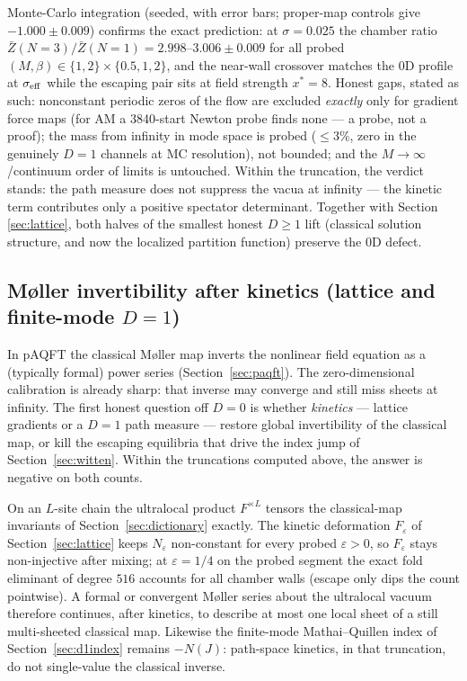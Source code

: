 \documentclass[11pt]{article}
\theoremstyle{definition}
\theoremstyle{remark}
\begin{document}
Monte-Carlo integration (seeded, with error bars; proper-map controls
give $-1.000\pm0.009$) confirms the exact prediction: at
$\sigma=0.025$ the chamber ratio
$\bar Z(N{=}3)/\bar Z(N{=}1)=2.998$--$3.006\pm0.009$ for all probed
$(M,\beta)\in\{1,2\}\times\{0.5,1,2\}$, and the near-wall crossover
matches the 0D profile at $\sigma_{\rm eff}$ while the escaping pair
sits at field strength $x^*=8$. Honest gaps, stated as such:
nonconstant periodic zeros of the flow are excluded \emph{exactly}
only for gradient force maps (for AM a 3840-start Newton probe finds
none — a probe, not a proof); the mass from infinity in mode space is
probed ($\le3\%$, zero in the genuinely $D=1$ channels at MC
resolution), not bounded; and the $M\to\infty$/continuum order of
limits is untouched. Within the truncation, the verdict stands: the
path measure does not suppress the vacua at infinity — the kinetic
term contributes only a positive spectator determinant. Together with
Section \ref{sec:lattice}, both halves of the smallest honest
$D\ge 1$ lift (classical solution structure, and now the localized
partition function) preserve the 0D defect.

\subsection{M{\o}ller invertibility after kinetics
(lattice and finite-mode $D=1$)}\label{sec:moller-kinetics}

In pAQFT the classical M{\o}ller map inverts the nonlinear field
equation as a (typically formal) power series
(Section~\ref{sec:paqft}). The zero-dimensional calibration is already
sharp: that inverse may converge and still miss sheets at infinity.
The first honest question off $D=0$ is whether \emph{kinetics} ---
lattice gradients or a $D=1$ path measure --- restore global
invertibility of the classical map, or kill the escaping equilibria
that drive the index jump of Section~\ref{sec:witten}. Within the
truncations computed above, the answer is negative on both counts.

On an $L$-site chain the ultralocal product $F^{\times L}$ tensors the
classical-map invariants of Section~\ref{sec:dictionary} exactly.
The kinetic deformation $F_\varepsilon$ of Section~\ref{sec:lattice}
keeps $N_\varepsilon$ non-constant for every probed $\varepsilon>0$, so
$F_\varepsilon$ stays non-injective after mixing; at $\varepsilon=1/4$
on the probed segment the exact fold eliminant of degree $516$
accounts for all chamber walls (escape only dips the count
pointwise). A formal or convergent M{\o}ller series about the
ultralocal vacuum therefore continues, after kinetics, to describe at
most one local sheet of a still multi-sheeted classical map. Likewise
the finite-mode Mathai--Quillen index of Section~\ref{sec:d1index}
remains $-N(J)$: path-space kinetics, in that truncation, do not
single-value the classical inverse.
\end{document}
